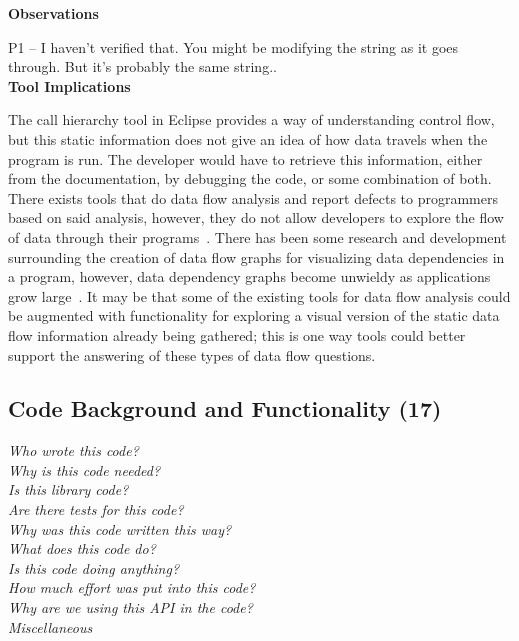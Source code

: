\documentclass[conference]{IEEEtran}
\begin{document}
\noindent\textbf{Observations}

P1 -- I haven't verified that. You might be modifying the string as it goes through. But it's probably the same string.. 
\\

\noindent\textbf{Tool Implications}

The call hierarchy tool in Eclipse provides a way of understanding control flow, but this static information does not give an idea of how data travels when the program is run. 
The developer would have to retrieve this information, either from the documentation, by debugging the code, or some combination of both. 
There exists tools that do data flow analysis and report defects to programmers based on said analysis, however, they do not allow developers to explore the flow of data through their programs~\cite{jovanovic2006pixy}. 
There has been some research and development surrounding the creation of data flow graphs for visualizing data dependencies in a program, however, data dependency graphs become unwieldy as applications grow large~\cite{ghosh2001method, ferrante1987program}. 
It may be that some of the existing tools for data flow analysis could be augmented with functionality for exploring a visual version of the static data flow information already being gathered; this is one way tools could better support the answering of these types of data flow questions.
\\



\noindent\subsection{\textbf{Code Background and Functionality (17)}}
\label{cbf}

\noindent\emph{Who wrote this code?} \\
\emph{Why is this code needed?} \\
\emph{Is this library code?} \\
\emph{Are there tests for this code?} \\
\emph{Why was this code written this way?} \\
\emph{What does this code do?} \\
\emph{Is this code doing anything?} \\
\emph{How much effort was put into this code?} \\
\emph{Why are we using this API in the code?} \\
\emph{Miscellaneous} \\
\end{document}
